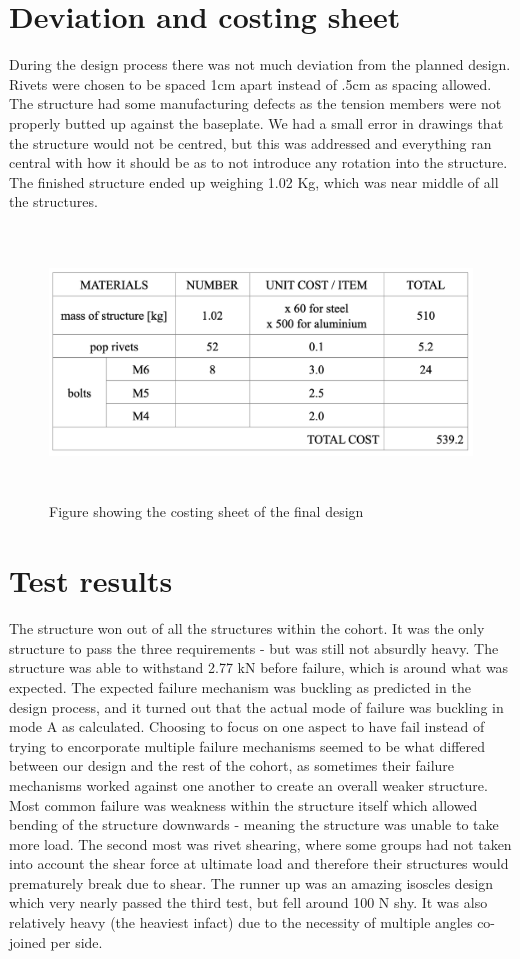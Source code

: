 \documentclass[12pt]{article}
\begin{document}
    \section{Deviation and costing sheet}
    During the design process there was not much deviation from the planned design. Rivets were chosen to be spaced 1cm apart instead of .5cm as spacing allowed. The structure had some
    manufacturing defects as the tension members were not properly butted up against the baseplate. We had a small error in drawings that the structure would not be centred, 
    but this was addressed and everything ran central with how it should be as to not introduce any rotation into the structure. The finished structure ended up weighing 1.02 Kg,
    which was near middle of all the structures. 
    \begin{figure}[H]
        \begin{center}
        \captionsetup{labelfont=bf}
        \captionsetup{justification=centering}
        \includegraphics[height=17pc]{costing_sheet.png}
        \caption{Figure showing the costing sheet of the final design}
        \end{center}
    \end{figure}
    \section{Test results}
        The structure won out of all the structures within the cohort. It was the only structure to pass the three requirements - but was still not absurdly heavy. The structure
        was able to withstand 2.77 kN before failure, which is around what was expected. The expected failure mechanism was buckling as predicted in the design process, and it turned out
        that the actual mode of failure was buckling in mode A as calculated. Choosing to focus on one aspect to have fail instead of trying to encorporate multiple failure mechanisms seemed
        to be what differed between our design and the rest of the cohort, as sometimes their failure mechanisms worked against one another to create an overall weaker structure. Most common
        failure was weakness within the structure itself which allowed bending of the structure downwards - meaning the structure was unable to take more load. The second most was rivet shearing,
        where some groups had not taken into account the shear force at ultimate load and therefore their structures would prematurely break due to shear. The runner up was an amazing
        isoscles design which very nearly passed the third test, but fell around 100 N shy. It was also relatively heavy (the heaviest infact) due to the necessity of multiple angles co-joined per side.
\end{document}
